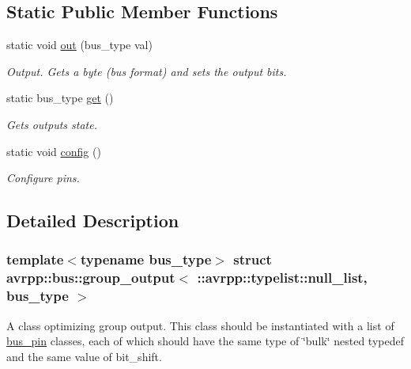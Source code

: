\subsection*{Static Public Member Functions}
\begin{DoxyCompactItemize}
\item 
static void \hyperlink{structavrpp_1_1bus_1_1group__output_3_01_1_1avrpp_1_1typelist_1_1null__list_00_01bus__type_01_4_a673b8b6c757542442d8f52831678e0be}{out} (bus\_\-type val)
\begin{DoxyCompactList}\small\item\em Output. Gets a byte (bus format) and sets the output bits. \item\end{DoxyCompactList}\item 
static bus\_\-type \hyperlink{structavrpp_1_1bus_1_1group__output_3_01_1_1avrpp_1_1typelist_1_1null__list_00_01bus__type_01_4_aa05c1002b7b606fd04eea2dff5142430}{get} ()
\begin{DoxyCompactList}\small\item\em Gets outputs state. \item\end{DoxyCompactList}\item 
static void \hyperlink{structavrpp_1_1bus_1_1group__output_3_01_1_1avrpp_1_1typelist_1_1null__list_00_01bus__type_01_4_a6f7ef980fc310139cac5f082f870f5e9}{config} ()
\begin{DoxyCompactList}\small\item\em Configure pins. \item\end{DoxyCompactList}\end{DoxyCompactItemize}


\subsection{Detailed Description}
\subsubsection*{template$<$typename bus\_\-type$>$ struct avrpp::bus::group\_\-output$<$ ::avrpp::typelist::null\_\-list, bus\_\-type $>$}

A class optimizing group output. This class should be instantiated with a list of \hyperlink{structavrpp_1_1bus_1_1bus__pin}{bus\_\-pin} classes, each of which should have the same type of \char`\"{}bulk\char`\"{} nested typedef and the same value of bit\_\-shift. 

